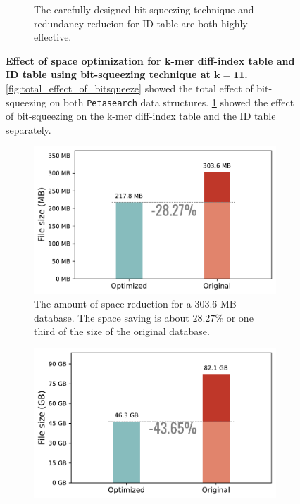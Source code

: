 \begin{figpage}
\begin{figure}
\begin{subfigure}{0.5\textwidth}
{The carefully designed bit-squeezing technique and redundancy reducion for ID table are both highly effective.}
      \label{fig:separate_effect_of_bitsqueeze}
    \end{subfigure}
    \caption{\textbf{Effect of space optimization for k-mer diff-index table and ID table using bit-squeezing technique at $\mathbf{k = 11}$.} \cref{fig:total_effect_of_bitsqueeze} showed the total effect of bit-squeezing on both \texttt{Petasearch} data structures.
\cref{fig:separate_effect_of_bitsqueeze} showed the effect of bit-squeezing on the k-mer diff-index table and the ID table separately.}
    \label{fig:space_opt}
  \end{figure}
  \begin{figure}
    \begin{subfigure}{0.5\textwidth}
      \centering
      \includegraphics[width=\textwidth]{images/seqdbsize_small.pdf}
      \caption{The amount of space reduction for a 303.6 MB database. The space saving is about $28.27\%$ or one third of the size of the original database.}
      \label{fig:seqdbsize_small}
    \end{subfigure}
    \begin{subfigure}{0.5\textwidth}
      \centering
      \includegraphics[width=\textwidth]{images/seqdbsize_large.pdf}

\end{subfigure}
\end{figure}
\end{figpage}
